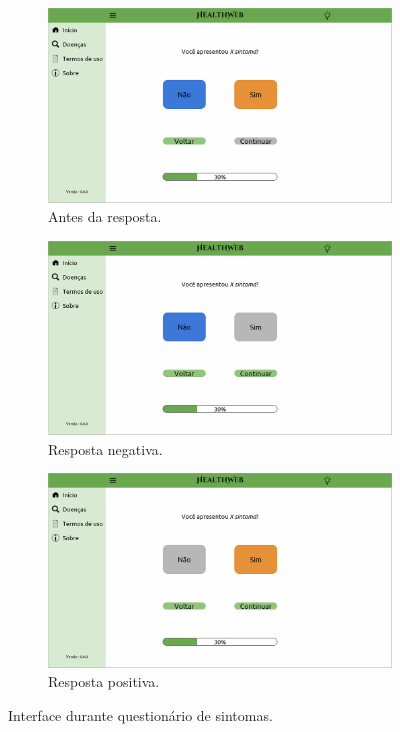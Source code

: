 \begin{figure}[htbp]
	\centering
	\begin{subfigure}{0.49\linewidth}
		\centering
		\includegraphics[width=\linewidth]{figure/prototype/desktop/symptom.png}
		\caption{Antes da resposta.}
		\label{fig:desktop:symptom}
	\end{subfigure}
	\linebreak
	\begin{subfigure}{0.49\linewidth}
		\centering
		\includegraphics[width=\linewidth]{figure/prototype/desktop/symptom_no.png}
		\caption{Resposta negativa.}
		\label{fig:desktop:symptom_no}
	\end{subfigure}
	\hfill
	\begin{subfigure}{0.49\linewidth}
		\centering
		\includegraphics[width=\linewidth]{figure/prototype/desktop/symptom_yes.png}
		\caption{Resposta positiva.}
		\label{fig:desktop:symptom_yes}
	\end{subfigure}
	\hfill
	\caption{Interface durante questionário de sintomas.}
	\label{fig:desktop:symptom_yes_no}
\end{figure}

